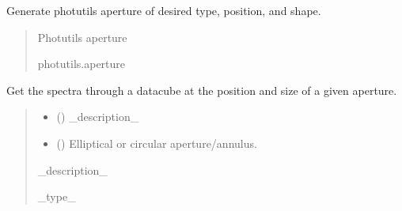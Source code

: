\documentclass[letterpaper,10pt,english]{sphinxmanual}
\begin{document}

\begin{fulllineitems}
\label{\detokenize{spectra:cubespa.spectra.create_aperture}}
\pysigstartsignatures
{}
\pysigstopsignatures
\sphinxAtStartPar
Generate photutils aperture of desired type, position, and shape.
\begin{quote}\begin{description}
\sphinxAtStartPar
Photutils aperture

\sphinxAtStartPar
photutils.aperture

\end{description}\end{quote}

\end{fulllineitems}


\begin{fulllineitems}
\label{\detokenize{spectra:cubespa.spectra.get_spectra}}
\pysigstartsignatures
{}
\pysigstopsignatures
\sphinxAtStartPar
Get the spectra through a datacube at the position and size of a given aperture.
\begin{quote}\begin{description}
\begin{itemize}
\item {} 
\sphinxAtStartPar
{} () \textendash{} \_description\_

\item {} 
\sphinxAtStartPar
{} () \textendash{} Elliptical or circular aperture/annulus.

\end{itemize}

\sphinxAtStartPar
\_description\_

\sphinxAtStartPar
\_type\_

\end{description}\end{quote}

\end{fulllineitems}
\end{document}

